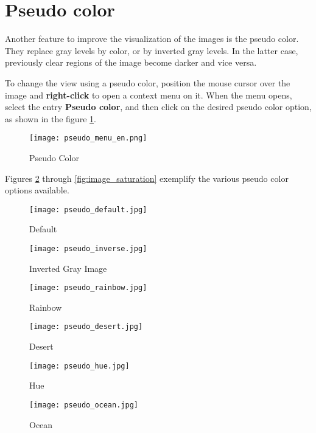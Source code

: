 \section{Pseudo color}

Another feature to improve the visualization of the images is the pseudo color. They replace gray levels by color, or by inverted gray levels. In the latter case, previously clear regions of the image become darker and vice versa.

To change the view using a pseudo color, position the mouse cursor over the image and \textbf{right-click} to open a context menu on it. When the menu opens, select the entry \textbf{Pseudo color}, and then click on the desired pseudo color option, as shown in the figure \ref{fig:pseudo_color}.

\begin{figure}[H]
\centering
\texttt{[image: pseudo\_menu\_en.png]}
\caption{Pseudo Color}
\label{fig:pseudo_color}
\end{figure}

Figures \ref{fig:image_default} through \ref{fig:image_saturation} exemplify the various pseudo color options available.\\

\begin{figure}[H]
\centering
\texttt{[image: pseudo\_default.jpg]}
\caption{Default}
\label{fig:image_default}
\end{figure}

\begin{figure}[H]
\centering
\texttt{[image: pseudo\_inverse.jpg]}
\caption{Inverted Gray Image}
\label{fig:image_inverted}
\end{figure}

\begin{figure}[H]
\centering
\texttt{[image: pseudo\_rainbow.jpg]}
\caption{Rainbow}
\label{fig:image_arc}
\end{figure}

\begin{figure}[H]
\centering
\texttt{[image: pseudo\_desert.jpg]}
\caption{Desert}
\label{fig:image_desert}
\end{figure}

\begin{figure}[H]
\centering
\texttt{[image: pseudo\_hue.jpg]}
\caption{Hue}
\label{fig:image_matiz}
\end{figure}

\begin{figure}[H]
\centering
\texttt{[image: pseudo\_ocean.jpg]}
\caption{Ocean}
\label{fig:image_ocean}
\end{figure}

